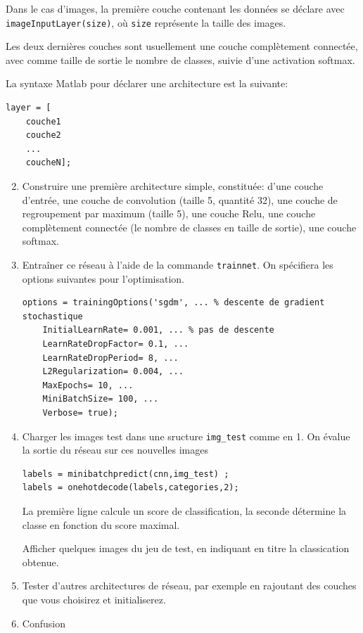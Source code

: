 Dans le cas d'images, la première couche contenant les données se déclare avec \texttt{imageInputLayer(size)}, où \texttt{size} représente la taille des images.

Les deux dernières couches sont usuellement une couche complètement connectée, avec comme taille de sortie le nombre de classes, suivie d'une activation softmax.

La syntaxe Matlab pour déclarer une architecture est la suivante:
\begin{lstlisting}
layer = [
	couche1
	couche2
	...
	coucheN];
\end{lstlisting}

\begin{enumerate}
	\setcounter{enumi}{1}
	\item Construire une première architecture simple, constituée: d'une couche d'entrée, une couche de convolution (taille 5, quantité 32), une couche de regroupement par maximum (taille 5), une couche Relu, une couche complètement connectée (le nombre de classes en taille de sortie), une couche softmax.
	
	\item Entraîner ce réseau à l'aide de la commande \texttt{trainnet}. On spécifiera les options suivantes pour l'optimisation.
	
\begin{lstlisting}
options = trainingOptions('sgdm', ... % descente de gradient stochastique
    InitialLearnRate= 0.001, ... % pas de descente
    LearnRateDropFactor= 0.1, ...
    LearnRateDropPeriod= 8, ...
    L2Regularization= 0.004, ...
    MaxEpochs= 10, ...
    MiniBatchSize= 100, ...
    Verbose= true);
\end{lstlisting} 

	\item Charger les images test dans une sructure \texttt{img\_test} comme en 1. On évalue la sortie du réseau sur ces nouvelles images
\begin{lstlisting}
labels = minibatchpredict(cnn,img_test)	;
labels = onehotdecode(labels,categories,2);
\end{lstlisting}
La première ligne calcule un score de classification, la seconde détermine la classe en fonction du score maximal.

Afficher quelques images du jeu de test, en indiquant en titre la classication obtenue.

	\item Tester d'autres architectures de réseau, par exemple en rajoutant des couches que vous choisirez et initialiserez.
	
	\item Confusion
\end{enumerate}

